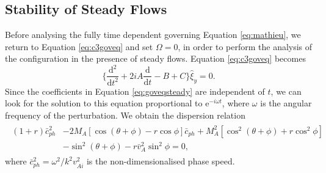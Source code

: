 \documentclass[12pt]{ociamthesis}
\begin{document}
\subsection{Stability of Steady Flows}
\label{subsec:steady}

Before analysing the fully time dependent governing Equation \eqref{eq:mathieu}, we return to Equation \eqref{eq:c3goveq} and set $\Omega = 0$, in order to perform the analysis of the configuration in the presence of steady flows.
Equation \eqref{eq:c3goveq} becomes
%
\begin{equation}
\label{eq:goveqsteady}
\bigg\{ \frac{\mathrm{d}^2}{\mathrm{d} t^2}
+ 2 i A \frac{\mathrm{d}}{\mathrm{d} t}
- B + C \bigg\} \hat \xi_y
= 0.
\end{equation}
%
Since the coefficients in Equation \eqref{eq:goveqsteady} are independent of $t$, we can look for the solution to this equation proportional to $\mathrm{e}^{-i \omega t}$, where $\omega$ is the angular frequency of the perturbation.
We obtain the dispersion relation 
%
\begin{align}
\begin{split}
\label{eq:c3disprel}
(1 + r) \bar c_{ph}^2
& - 2 M_A [ \cos(\theta + \phi) - r \cos\phi ] \bar c_{ph}
+ M_A^2 [ \cos^2(\theta + \phi) + r \cos^2\phi ]
\\[0.1cm]
& - \sin^2(\theta + \phi)
- r \bar v_{A}^2 \sin^2\phi
= 0,
\end{split}
\end{align}
%
where $\bar c_{ph}^2 = \omega^2 / k^2 v_{A i}^2$ is the non-dimensionalised phase speed.
\end{document}
